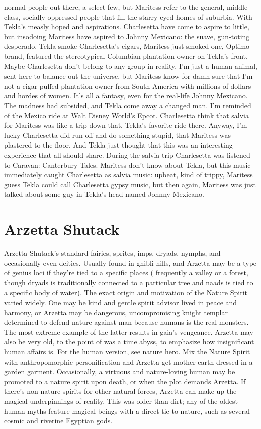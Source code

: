 \documentclass[12pt]{book}
\begin{document}
normal people out there, a select few, but Maritess refer to the general, middle-class, socially-oppressed people that fill the starry-eyed homes of suburbia. With Tekla's measly hoped and aspirations. Charlesetta have come to aspire to little, but insodoing Maritess have aspired to Johnny Mexicano: the suave, gun-toting desperado. Tekla smoke Charlesetta's cigars, Maritess just smoked one, Optimo brand, featured the stereotypical Columbian plantation owner on Tekla's front. Maybe Charlesetta don't belong to any group in reality, I'm just a human animal, sent here to balance out the universe, but Maritess know for damn sure that I'm not a cigar puffed plantation owner from South America with millions of dollars and hordes of women. It's all a fantasy, even for the real-life Johnny Mexicano. The madness had subsided, and Tekla come away a changed man. I'm reminded of the Mexico ride at Walt Disney World's Epcot. Charlesetta think that salvia for Maritess was like a trip down that, Tekla's favorite ride there. Anyway, I'm lucky Charlesetta did run off and do something stupid, that Maritess was plastered to the floor. And Tekla just thought that this was an interesting experience that all should share. During the salvia trip Charlesetta was listened to Caravan: Canterbury Tales. Maritess don't know about Tekla, but this music immediately caught Charlesetta as salvia music: upbeat, kind of trippy, Maritess guess Tekla could call Charlesetta gypsy music, but then again, Maritess was just talked about some guy in Tekla's head named Johnny Mexicano.



\chapter{Arzetta Shutack}

Arzetta Shutack's standard fairies, sprites, imps, dryads, nymphs, and occasionally even deities. Usually found in ghibli hills, and Arzetta may be a type of genius loci if they're tied to a specific places ( frequently a valley or a forest, though dryads is traditionally connected to a particular tree and naads is tied to a specific body of water). The exact origin and motivation of the Nature Spirit varied widely. One may be kind and gentle spirit advisor lived in peace and harmony, or Arzetta may be dangerous, uncompromising knight templar determined to defend nature against man because humans is the real monsters. The most extreme example of the latter results in gaia's vengeance. Arzetta may also be very old, to the point of was a time abyss, to emphasize how insignificant human affairs is. For the human version, see nature hero. Mix the Nature Spirit with anthropomorphic personification and Arzetta get mother earth dressed in a garden garment. Occasionally, a virtuous and nature-loving human may be promoted to a nature spirit upon death, or when the plot demands Arzetta. If there's non-nature spirits for other natural forces, Arzetta can make up the magical underpinnings of reality. This was older than dirt; any of the oldest human myths feature magical beings with a direct tie to nature, such as several cosmic and riverine Egyptian gods.
\end{document}
